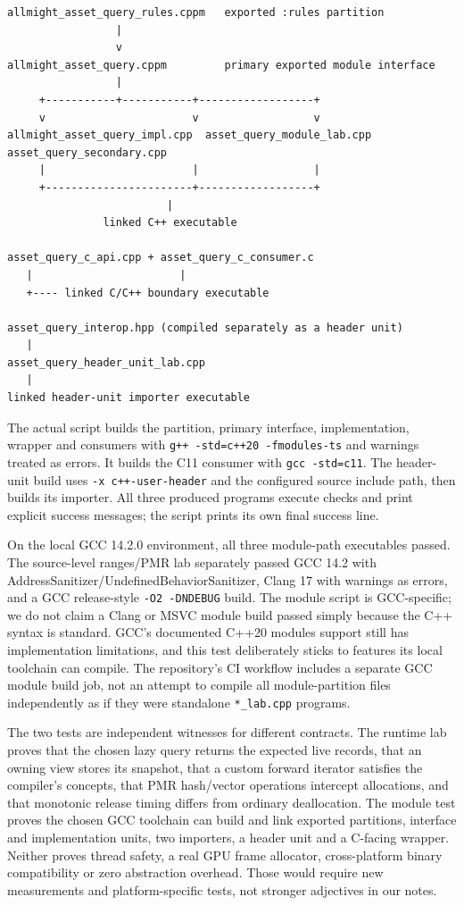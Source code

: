 \begin{verbatim}
allmight_asset_query_rules.cppm   exported :rules partition
                 |
                 v
allmight_asset_query.cppm         primary exported module interface
                 |
     +-----------+-----------+------------------+
     v                       v                  v
allmight_asset_query_impl.cpp  asset_query_module_lab.cpp  asset_query_secondary.cpp
     |                       |                  |
     +-----------------------+------------------+
                         |
               linked C++ executable

asset_query_c_api.cpp + asset_query_c_consumer.c
   |                       |
   +---- linked C/C++ boundary executable

asset_query_interop.hpp (compiled separately as a header unit)
   |
asset_query_header_unit_lab.cpp
   |
linked header-unit importer executable
\end{verbatim}

The actual script builds the partition, primary interface, implementation, wrapper and consumers with \texttt{g++\ -std=c++20\ -fmodules-ts} and warnings treated as errors. It builds the C11 consumer with \texttt{gcc\ -std=c11}. The header-unit build uses \texttt{-x\ c++-user-header} and the configured source include path, then builds its importer. All three produced programs execute checks and print explicit success messages; the script prints its own final success line.

On the local GCC 14.2.0 environment, all three module-path executables passed. The source-level ranges/PMR lab separately passed GCC 14.2 with AddressSanitizer/UndefinedBehaviorSanitizer, Clang 17 with warnings as errors, and a GCC release-style \texttt{-O2\ -DNDEBUG} build. The module script is GCC-specific; we do not claim a Clang or MSVC module build passed simply because the C++ syntax is standard. GCC's documented C++20 modules support still has implementation limitations, and this test deliberately sticks to features its local toolchain can compile. The repository's CI workflow includes a separate GCC module build job, not an attempt to compile all module-partition files independently as if they were standalone \texttt{*\_lab.cpp} programs.

The two tests are independent witnesses for different contracts. The runtime lab proves that the chosen lazy query returns the expected live records, that an owning view stores its snapshot, that a custom forward iterator satisfies the compiler's concepts, that PMR hash/vector operations intercept allocations, and that monotonic release timing differs from ordinary deallocation. The module test proves the chosen GCC toolchain can build and link exported partitions, interface and implementation units, two importers, a header unit and a C-facing wrapper. Neither proves thread safety, a real GPU frame allocator, cross-platform binary compatibility or zero abstraction overhead. Those would require new measurements and platform-specific tests, not stronger adjectives in our notes.

